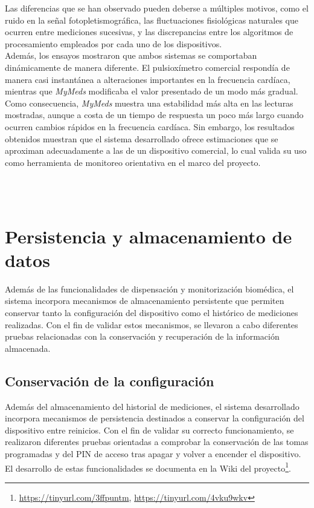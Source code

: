 Las diferencias que se han observado pueden deberse a múltiples motivos, como el ruido en la señal fotopletismográfica, las fluctuaciones fisiológicas naturales que ocurren entre mediciones sucesivas, y las discrepancias entre los algoritmos de procesamiento empleados por cada uno de los dispositivos.\\

Además, los ensayos mostraron que ambos sistemas se comportaban dinámicamente de manera diferente. El pulsioxímetro comercial respondía de manera casi instantánea a alteraciones importantes en la frecuencia cardíaca, mientras que \textit{MyMeds} modificaba el valor presentado de un modo más gradual.\\

Como consecuencia, \textit{MyMeds} muestra una estabilidad más alta en las lecturas mostradas, aunque a costa de un tiempo de respuesta un poco más largo cuando ocurren cambios rápidos en la frecuencia cardíaca. Sin embargo, los resultados obtenidos muestran que el sistema desarrollado ofrece estimaciones que se aproximan adecuadamente a las de un dispositivo comercial, lo cual valida su uso como herramienta de monitoreo orientativa en el marco del proyecto.\\

\

\

\section{Persistencia y almacenamiento de datos}

Además de las funcionalidades de dispensación y monitorización biomédica, el sistema incorpora mecanismos de almacenamiento persistente que permiten conservar tanto la configuración del dispositivo como el histórico de mediciones realizadas. Con el fin de validar estos mecanismos, se llevaron a cabo diferentes pruebas relacionadas con la conservación y recuperación de la información almacenada.

\subsection{Conservación de la configuración}

Además del almacenamiento del historial de mediciones, el sistema desarrollado incorpora mecanismos de persistencia destinados a conservar la configuración del dispositivo entre reinicios. Con el fin de validar su correcto funcionamiento, se realizaron diferentes pruebas orientadas a comprobar la conservación de las tomas programadas y del PIN de acceso tras apagar y volver a encender el dispositivo. El desarrollo de estas funcionalidades se documenta en la Wiki del proyecto\footnote{\url{https://tinyurl.com/3ffpuntm}, \url{https://tinyurl.com/4vku9wkv}}.\\

